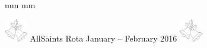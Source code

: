 \documentclass[10pt]{article}
\begin{document}
\ifx\pdfoutput\undefined
\else
{} mm %
 mm
\fi
\begingroup
\ifpdf
\else
{}
\fi
\endgroup
\thispagestyle{empty}
\begin{center}
{\Large 
  \includegraphics[width=1cm, scale=0.10]{bells.jpeg}
  AllSaints Rota 
January -- February 2016
  \includegraphics[width=1cm, scale=0.10]{bells.jpeg}
}%
\vspace{0.5em}


\end{center}
\end{document}
